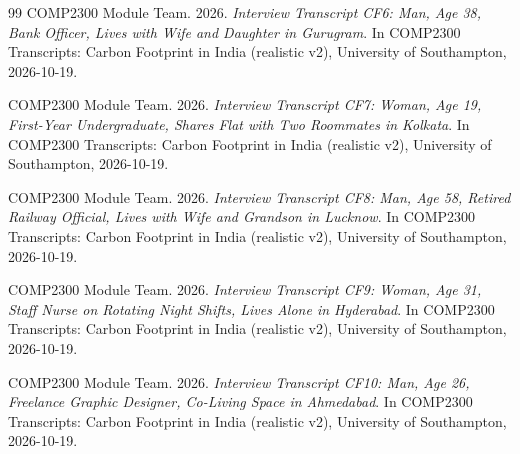\documentclass[12pt, a4paper]{article}
\begin{document}
\begin{thebibliography}{99}
COMP2300 Module Team. 2026. \textit{Interview Transcript CF6: Man, Age 38, Bank Officer, Lives with Wife and Daughter in Gurugram}. In COMP2300 Transcripts: Carbon Footprint in India (realistic v2), University of Southampton, 2026-10-19.

COMP2300 Module Team. 2026. \textit{Interview Transcript CF7: Woman, Age 19, First-Year Undergraduate, Shares Flat with Two Roommates in Kolkata}. In COMP2300 Transcripts: Carbon Footprint in India (realistic v2), University of Southampton, 2026-10-19.

COMP2300 Module Team. 2026. \textit{Interview Transcript CF8: Man, Age 58, Retired Railway Official, Lives with Wife and Grandson in Lucknow}. In COMP2300 Transcripts: Carbon Footprint in India (realistic v2), University of Southampton, 2026-10-19.

COMP2300 Module Team. 2026. \textit{Interview Transcript CF9: Woman, Age 31, Staff Nurse on Rotating Night Shifts, Lives Alone in Hyderabad}. In COMP2300 Transcripts: Carbon Footprint in India (realistic v2), University of Southampton, 2026-10-19.

COMP2300 Module Team. 2026. \textit{Interview Transcript CF10: Man, Age 26, Freelance Graphic Designer, Co-Living Space in Ahmedabad}. In COMP2300 Transcripts: Carbon Footprint in India (realistic v2), University of Southampton, 2026-10-19.
\end{thebibliography}
\end{document}
